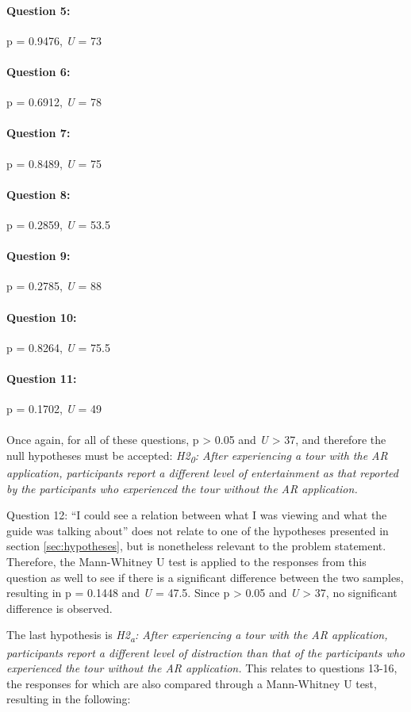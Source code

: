 \paragraph{Question 5:} p = 0.9476, \textit{U} = 73
\paragraph{Question 6:} p = 0.6912, \textit{U} = 78
\paragraph{Question 7:} p = 0.8489, \textit{U} = 75
\paragraph{Question 8:} p = 0.2859, \textit{U} = 53.5
\paragraph{Question 9:} p = 0.2785, \textit{U} = 88
\paragraph{Question 10:} p = 0.8264, \textit{U} = 75.5
\paragraph{Question 11:} p = 0.1702, \textit{U} = 49\\
\\
Once again, for all of these questions, p > 0.05 and \textit{U} > 37, and therefore the null hypotheses must be accepted: \textit{H2\textsubscript{0}: After experiencing a tour with the AR application, participants report a different level of entertainment as that reported by the participants who experienced the tour without the AR application.}

Question 12: “I could see a relation between what I was viewing and what the guide was talking about” does not relate to one of the hypotheses presented in section \ref{sec:hypotheses}, but is nonetheless relevant to the problem statement. Therefore, the Mann-Whitney U test is applied to the responses from this question as well to see if there is a significant difference between the two samples, resulting in p = 0.1448 and \textit{U} = 47.5. Since p > 0.05 and \textit{U} > 37, no significant difference is observed. 

The last hypothesis is \textit{H2\textsubscript{a}: After experiencing a tour with the AR application, participants report a different level of distraction than that of the participants who experienced the tour without the AR application.} This relates to questions 13-16, the responses for which are also compared through a Mann-Whitney U test, resulting in the following:

